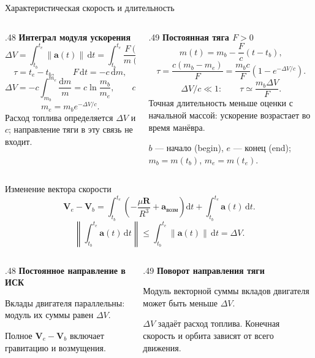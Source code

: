 \documentclass[11pt,aspectratio=169,t]{beamer}
\newcommand{\eqcompact}{\fontsize{10}{12}\selectfont}
\newcommand{\derivationmathspacing}{%
  \setlength{\abovedisplayskip}{2pt}%
  \setlength{\belowdisplayskip}{3pt}%
  \setlength{\abovedisplayshortskip}{2pt}%
  \setlength{\belowdisplayshortskip}{2pt}%
  \setlength{\jot}{2pt}}
\newcommand{\vect}[1]{\boldsymbol{#1}}
\begin{document}
\begin{frame}{Характеристическая скорость и длительность}
\relax\derivationmathspacing
\begin{columns}[T,onlytextwidth]
\begin{column}{.48\textwidth}
\textbf{Интеграл модуля ускорения}
{\eqcompact\derivationmathspacing
\[
 \Delta V=\int_{t_b}^{t_e}\|\vect a(t)\|\,\mathrm dt
         =\int_{t_b}^{t_e}\frac{F(t)}{m(t)}\,\mathrm dt,
\]
\[
 \tau=t_e-t_b,\qquad F\,\mathrm dt=-c\,\mathrm dm,
\]
\[
 \Delta V=-c\int_{m_b}^{m_e}\frac{\mathrm dm}{m}
          =c\ln\frac{m_b}{m_e},\qquad c=\mathrm{const},
\]
\[
 \boxed{m_e=m_b e^{-\Delta V/c}.}
\]
}
Расход топлива определяется $\Delta V$ и $c$; направление тяги в эту связь не входит.
\end{column}
\begin{column}{.49\textwidth}
\textbf{Постоянная тяга $F>0$}
{\eqcompact\derivationmathspacing
\[
 m(t)=m_b-\frac Fc(t-t_b),
\]
\[
 \boxed{\tau=\frac{c(m_b-m_e)}F
       =\frac{m_bc}F\left(1-e^{-\Delta V/c}\right).}
\]
\[
 \Delta V/c\ll1:\qquad\tau\simeq\frac{m_b\Delta V}F.
\]
}
Точная длительность меньше оценки с начальной массой: ускорение возрастает во время манёвра.
\par\smallskip
$b$ --- начало (begin), $e$ --- конец (end); $m_b=m(t_b)$, $m_e=m(t_e)$.
\end{column}
\end{columns}
\end{frame}

\begin{frame}{Изменение вектора скорости}
\relax\derivationmathspacing
{\eqcompact\derivationmathspacing
\[
 \vect V_e-\vect V_b=
 \int_{t_b}^{t_e}\left(-\frac{\mu\vect R}{R^3}
                    +\vect a_{\text{возм}}\right)\mathrm dt
 +\int_{t_b}^{t_e}\vect a(t)\,\mathrm dt.
\]
\[
 \left\|\int_{t_b}^{t_e}\vect a(t)\,\mathrm dt\right\|
 \le\int_{t_b}^{t_e}\|\vect a(t)\|\,\mathrm dt=\Delta V.
\]
}
\begin{columns}[T,onlytextwidth]
\begin{column}{.48\textwidth}
\textbf{Постоянное направление в ИСК}
\par\smallskip
Вклады двигателя параллельны: модуль их суммы равен $\Delta V$.
\par\smallskip
Полное $\vect V_e-\vect V_b$ включает гравитацию и возмущения.
\end{column}
\begin{column}{.49\textwidth}
\textbf{Поворот направления тяги}
\par\smallskip
Модуль векторной суммы вкладов двигателя может быть меньше $\Delta V$.
\par\smallskip
$\Delta V$ задаёт расход топлива. Конечная скорость и орбита зависят от всего движения.
\end{column}
\end{columns}
\end{frame}
\end{document}
